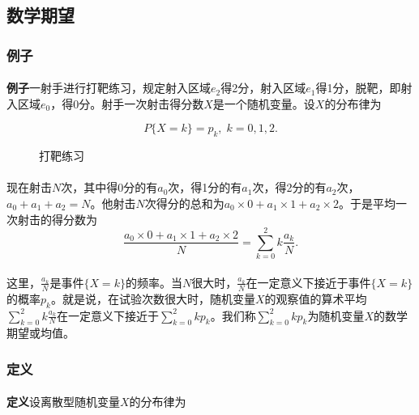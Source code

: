 \subsection{数学期望}
\subsubsection{例子}
\paragraph{}
\textbf{例子\;}一射手进行打靶练习，规定射入区域$e_2$得2分，射入区域$e_1$得1分，脱靶，即射入区域$e_0$，得0分。射手一次射击得分数$X$是一个随机变量。设$X$的分布律为

\begin{equation*}
  P\{X=k\}=p_k, \; k = 0,1,2.
\end{equation*}

\begin{figure}[H]
\centering
  
  \caption{打靶练习}
  \label{打靶练习}
\end{figure}

\paragraph{}
现在射击$N$次，其中得0分的有$a_0$次，得1分的有$a_1$次，得2分的有$a_2$次，$a_0+a_1+a_2=N$。他射击$N$次得分的总和为$a_0 \times 0 + a_1 \times 1 + a_2 \times 2$。于是平均一次射击的得分数为
\begin{equation*}
  \frac{a_0 \times 0 + a_1 \times 1 + a_2 \times 2}{N} = \sum_{k=0}^2 k \frac{a_k}{N}.
\end{equation*}

\paragraph{}
这里，$\displaystyle \frac{a_k}{N}$是事件$\{X=k\}$的频率。当$N$很大时，$\displaystyle \frac{a_k}{N}$在一定意义下接近于事件$\{X=k\}$的概率$p_k$。就是说，在试验次数很大时，随机变量$X$的观察值的算术平均$\displaystyle \sum_{k=0}^2 k \frac{a_k}{N}$在一定意义下接近于$\displaystyle \sum_{k=0}^2 kp_k$。我们称$\displaystyle \sum_{k=0}^2 kp_k$为随机变量$X$的数学期望或均值。

\subsubsection{定义}
\paragraph{}
\textbf{定义\;}设离散型随机变量$X$的分布律为

